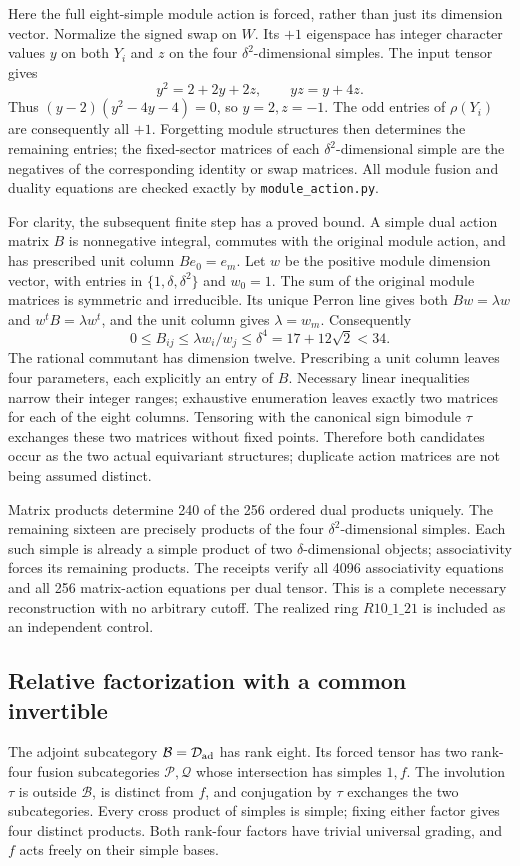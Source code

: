 Here the full eight-simple module action is forced, rather than just its
dimension vector. Normalize the signed swap on $W$. Its $+1$ eigenspace
has integer character values $y$ on both $Y_i$ and $z$ on the four
$\delta^2$-dimensional simples. The input tensor gives
\[
 y^2=2+2y+2z,\qquad yz=y+4z.
\]
Thus $(y-2)(y^2-4y-4)=0$, so $y=2,z=-1$. The odd entries of
$\rho(Y_i)$ are consequently all $+1$. Forgetting module structures
then determines the remaining entries; the fixed-sector matrices of
each $\delta^2$-dimensional simple are the negatives of the corresponding
identity or swap matrices. All module fusion and duality equations are
checked exactly by \nolinkurl{module_action.py}.

For clarity, the subsequent finite step has a proved bound. A simple
dual action matrix $B$ is nonnegative integral, commutes with the original
module action, and has prescribed unit column $Be_0=e_m$. Let $w$ be the
positive module dimension vector, with entries in $\{1,\delta,\delta^2\}$
and $w_0=1$. The sum of the original module matrices is symmetric and
irreducible. Its unique Perron line gives both
$Bw=\lambda w$ and $w^tB=\lambda w^t$, and the unit column gives
$\lambda=w_m$. Consequently
\[
 0\leq B_{ij}\leq\lambda w_i/w_j\leq\delta^4
 =17+12\sqrt2<34.
\]
The rational commutant has dimension twelve. Prescribing a unit column
leaves four parameters, each explicitly an entry of $B$. Necessary linear
inequalities narrow their integer ranges; exhaustive enumeration leaves
exactly two matrices for each of the eight columns. Tensoring with the
canonical sign bimodule $\tau$ exchanges these two matrices without fixed
points. Therefore both candidates occur as the two actual equivariant
structures; duplicate action matrices are not being assumed distinct.

Matrix products determine 240 of the 256 ordered dual products uniquely.
The remaining sixteen are precisely products of the four
$\delta^2$-dimensional simples. Each such simple is already a simple
product of two $\delta$-dimensional objects; associativity forces its
remaining products. The receipts verify all 4096 associativity equations
and all 256 matrix-action equations per dual tensor. This is a complete
necessary reconstruction with no arbitrary cutoff. The realized ring
$R10\_1\_21$ is included as an independent control.

\subsection{Relative factorization with a common invertible}
The adjoint subcategory $\mathcal B=\mathcal D_{\rm ad}$ has rank eight.
Its forced tensor has two rank-four fusion subcategories
$\mathcal P,\mathcal Q$ whose intersection has simples $1,f$.
The involution $\tau$ is outside $\mathcal B$, is distinct from $f$,
and conjugation by $\tau$ exchanges the two subcategories.
Every cross product of simples is simple; fixing either factor gives
four distinct products. Both rank-four factors have trivial universal
grading, and $f$ acts freely on their simple bases.


